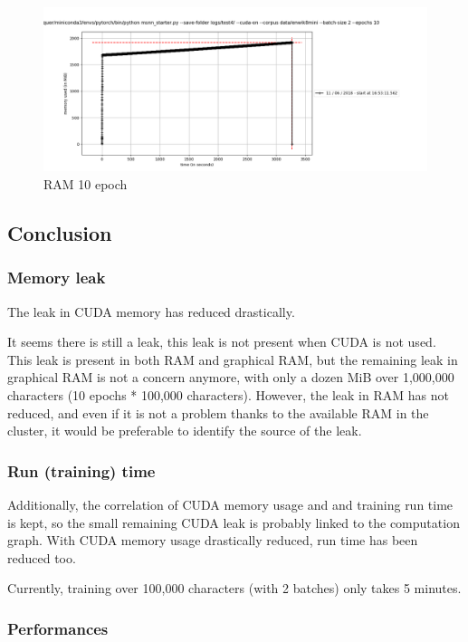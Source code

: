 \begin{figure}[H]
\centering
\includegraphics[width=\textwidth]{parts/appendix/reports-gmsnn/docs_esteban-latex/test_reports/2018-06-12/history_RAM.png}
\caption{RAM 10 epoch}
\end{figure}

\subsection{Conclusion}

\subsubsection{Memory leak}

The leak in CUDA memory has reduced drastically.

It seems there is still a leak, this leak is not present when CUDA is
not used. This leak is present in both RAM and graphical RAM, but the
remaining leak in graphical RAM is not a concern anymore, with only a
dozen MiB over 1,000,000 characters (10 epochs * 100,000 characters).
However, the leak in RAM has not reduced, and even if it is not a
problem thanks to the available RAM in the cluster, it would be
preferable to identify the source of the leak.

\subsubsection{Run (training) time}

Additionally, the correlation of CUDA memory usage and and training run
time is kept, so the small remaining CUDA leak is probably linked to the
computation graph. With CUDA memory usage drastically reduced, run time
has been reduced too.

Currently, training over 100,000 characters (with 2 batches) only takes
5 minutes.

\subsubsection{Performances}


